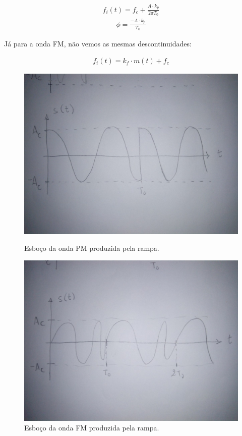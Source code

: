 \begin{align}\label{eq:freq}
    f_i (t) = f_c + \frac{A\cdot k_p}{2\pi T_0}
\end{align}
\begin{align}\label{eq:pshift}
    \phi = \frac{-A \cdot k_p}{T_0}
\end{align}

Já para a onda FM, não vemos as mesmas descontinuidades:

\begin{align*}
    f_i (t) = k_f \cdot m(t) + f_c
\end{align*}

\begin{figure}[H]
    \begin{minipage}{0.5\textwidth}
        \centering
        \includegraphics[width=0.9\linewidth]{phase.jpg}
        \caption{Esboço da onda PM produzida pela rampa.}
        \label{fig:my_label}
    \end{minipage}%
    \begin{minipage}{0.5\textwidth}
        \centering
        \includegraphics[width=0.9\linewidth]{frequency.jpg}
        \caption{Esboço da onda FM produzida pela rampa.}
        \label{fig:my_label}
    \end{minipage}
\end{figure}

